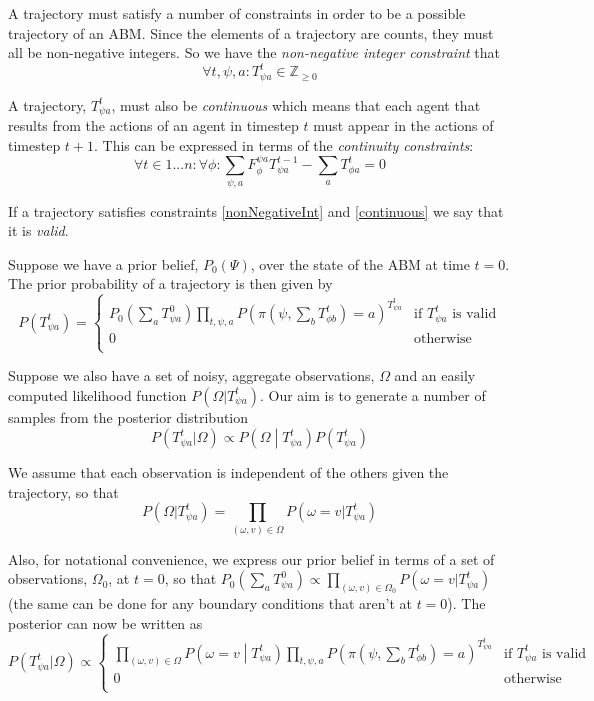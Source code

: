 \documentclass{article}
\begin{document}
A trajectory must satisfy a number of constraints in order to be a possible trajectory of an ABM. Since the elements of a trajectory are counts, they must all be non-negative integers. So we have the \textit{non-negative integer constraint} that
\begin{equation}
\forall t,\psi, a: T^t_{\psi a} \in \mathbb{Z}_{\ge 0}
\label{nonNegativeInt}
\end{equation}

A trajectory, $T^t_{\psi a}$, must also be \textit{continuous} which means that each agent that results from the actions of an agent in timestep $t$ must appear in the actions of timestep $t+1$. This can be expressed in terms of the \textit{continuity constraints}:
\begin{equation}
\forall t \in 1 ... n:\forall \phi: \sum_{\psi, a} F_\phi^{\psi a}T^{t-1}_{\psi a} - \sum_a T^t_{\phi a} = 0
\label{continuous}
\end{equation}

If a trajectory satisfies constraints \ref{nonNegativeInt} and \ref{continuous} we say that it is \textit{valid}.

Suppose we have a prior belief, $P_0(\Psi)$, over the state of the ABM at time $t=0$. The prior probability of a trajectory is then given by
\[
P(T^t_{\psi a}) =
\begin{cases}
P_0(\sum_aT^0_{\psi a}) \prod_{t, \psi, a} P(\pi(\psi,\sum_bT^{t}_{\phi b})=a)^{T^{t}_{\psi a}} & \text{if } T^t_{\psi a} \text{ is valid} \\
0 & \text{otherwise}\\
\end{cases}
\]

Suppose we also have a set of noisy, aggregate observations, $\Omega$ and an easily computed likelihood function $P(\Omega|T^t_{\psi a})$. Our aim is to generate a number of samples from the posterior distribution
\[
P(T^t_{\psi a}|\Omega) \propto P\left(\Omega \middle| T^{t}_{\psi a}\right)P(T^t_{\psi a})
\]

We assume that each observation is independent of the others given the trajectory, so that
\[
P(\Omega|T^t_{\psi a}) = \prod_{(\omega,v) \in \Omega} P(\omega=v|T^t_{\psi a})
\]

Also, for notational convenience, we express our prior belief in terms of a set of observations, $\Omega_0$, at $t=0$, so that $P_0(\sum_a T^0_{\psi a}) \propto \prod_{(\omega,v) \in \Omega_0} P(\omega=v|T^t_{\psi a})$ (the same can be done for any boundary conditions that aren't at $t=0$). The posterior can now be written as
\begin{equation}
P(T^t_{\psi a}|\Omega) \propto 
\begin{cases}
\prod_{(\omega,v) \in \Omega} P\left(\omega=v \middle| T^{t}_{\psi a}\right) \prod_{t, \psi, a}P(\pi(\psi,\sum_bT^{t}_{\phi b})=a)^{T^{t}_{\psi a}} & \text{if } T^t_{\psi a} \text{ is valid} \\
0 & \text{otherwise}\\
\end{cases}
\label{posterior}
\end{equation}
\end{document}
